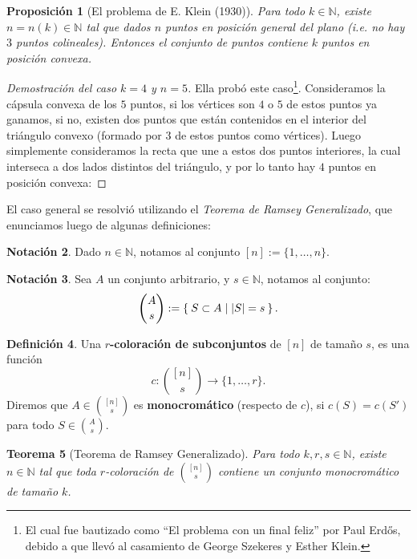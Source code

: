 \documentclass[12pt]{report}
\theoremstyle{plain}
\newtheorem{theorem}{Teorema}[section]
\newtheorem{proposition}[theorem]{Proposición}
\theoremstyle{definition}
\newtheorem{definition}[theorem]{Definición}
\newtheorem{notation}[theorem]{Notación}
\newcommand{\naturals}{\mathbb{N}}
\newcommand{\abs}[1]{\left \vert #1 \right \vert}
\begin{document}
\begin{proposition}[El problema de E. Klein (1930)]
Para todo $k \in \naturals$, existe $n = n(k) \in \naturals$ tal que dados $n$ puntos en posición general del plano (i.e. no hay $3$ puntos colineales). Entonces el conjunto de puntos contiene $k$ puntos en posición convexa.
\end{proposition}
\begin{proof}[Demostración del caso $k = 4$ y $n = 5$]
Ella probó este caso\footnote{El cual fue bautizado como ``El problema con un final feliz'' por Paul Erdős, debido a que llevó al casamiento de George Szekeres y Esther Klein.}. Consideramos la cápsula convexa de los $5$ puntos, si los vértices son $4$ o $5$ de estos puntos ya ganamos, si no, existen dos puntos que están contenidos en el interior del triángulo convexo (formado por $3$ de estos puntos como vértices). Luego simplemente consideramos la recta que une a estos dos puntos interiores, la cual interseca a dos lados distintos del triángulo, y por lo tanto hay $4$ puntos en posición convexa:




\end{proof}

El caso general se resolvió utilizando el \textit{Teorema de Ramsey Generalizado}, que enunciamos luego de algunas definiciones:

\begin{notation}
Dado $n \in \naturals$, notamos al conjunto $[n] := \{1, \ldots, n\}$.
\end{notation}

\begin{notation}
Sea $A$ un conjunto arbitrario, y $s \in \naturals$, notamos al conjunto:
\[
    \binom{A}{s} := \Set{S \subset A | \abs S = s}.
\]
\end{notation}

\begin{definition}
Una \textbf{$r$-coloración de subconjuntos} de $[n]$ de tamaño $s$, es una función
\[
    c : \binom{[n]}{s} \longrightarrow \{1, \ldots, r\}.
\]
Diremos que $A \in \binom{[n]}s$ es \textbf{monocromático} (respecto de $c$), si $c(S) = c(S')$ para todo $S \in \binom{A}s$.
\end{definition}

\begin{theorem}[Teorema de Ramsey Generalizado]\label{th:teorema de Ramsey Generalizado}
Para todo $k,r,s \in \naturals$, existe $n \in \naturals$ tal que toda $r$-coloración de $\binom{[n]}{s}$ contiene un conjunto monocromático de tamaño $k$.
\end{theorem}
\end{document}
